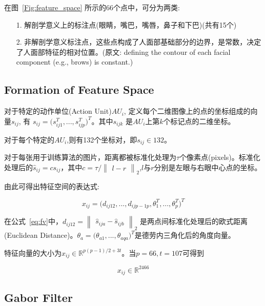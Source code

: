 \documentclass[11pt, a4paper]{article}
\begin{document}
在图~\ref{Fig:feature_space} 所示的66个点中，可分为两类:

\begin{itemize}
\item[1.] 解剖学意义上的标注点(眼睛，嘴巴，嘴唇，鼻子和下巴)(共有15个)
\item[2.] 非解剖学意义标注点，这些点构成了人面部基础部分的边界，是常数，决定了人面部特征的相对位置。(原文: defining the contour of each
facial component (e.g., brows) is constant.)
\end{itemize}

\subsection{Formation of Feature Space}

对于特定的动作单位(Action Unit)${AU}_{i}$, 定义每个二维图像上的点的坐标组成的向量$s_{ij}$, 有 $s_{ij} = (s_{ij1}^{T},...,s_{ijp}^{T}{)}^{T}$。其中$s_{ijk}$ 是${AU}_{i}$上第$k$个标记点的二维坐标。

对于每个特定的${AU}_{i}$,则有132个坐标对，即$s_{ij} \in 132$。

对于每张用于训练算法的图片，距离都被标准化处理为$\tau$个像素点(pixels)。标准化处理后的$\widehat{s}_{ij} = cs_{ij}$，其中$c = \tau /{\begin{Vmatrix} l-r \end{Vmatrix}}_{2}$,$l$与$r$分别是左眼与右眼中心点的坐标。

由此可得出特征空间的表达式:

\begin{equation}
\label{eq:fv}
x_{ij} = (d_{ij12},...,d_{ijp-1p},{\theta}^{T}_{1},...,{\theta}^{T}_{p}{)}^{T}
\end{equation}

在公式~\ref{eq:fv}中，$d_{ij12} = {\begin{Vmatrix} \widehat{s}_{ija} - \widehat{s}_{ijb} \end{Vmatrix}}_{2}$ 是两点间标准化处理后的欧式距离(Euclidean Distance)。$\theta_{a} = (\theta_{a1},...,\theta_{aqa}{)}^{T}$是德劳内三角化后的角度向量。

特征向量的大小为$x_{ij} \in {\mathbb{R}}^{p(p-1)/2 + 3t}$。当$p = 66, t = 107$可得到

\begin{equation}
	x_{ij} \in {\mathbb{R}}^{2466}
\end{equation}

\subsection{Gabor Filter}
\end{document}
